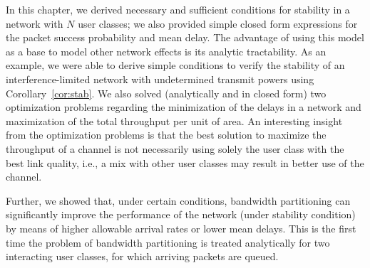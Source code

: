 In this chapter, we derived necessary and sufficient conditions for stability in a network with $N$ user classes; we also provided simple closed form expressions for the packet success probability and mean delay. The advantage of using this model as a base to model other network effects is its analytic tractability.
%
As an example, we were able to derive simple conditions to verify the stability of an interference-limited network with undetermined transmit powers using Corollary~\ref{cor:stab}.
%
We also solved (analytically and in closed form) two optimization problems regarding the minimization of the delays in a network and maximization of the total throughput per unit of area.
%
An interesting insight from the optimization problems is that the best solution to maximize the throughput of a channel is not necessarily using solely the user class with the best link quality, i.e., a mix with other user classes may result in better use of the channel.
% 

Further, we showed that, under certain conditions, bandwidth partitioning can significantly improve the performance of the network (under stability condition) by means of higher allowable arrival rates or lower mean delays. This is the first time the problem of bandwidth partitioning is treated analytically for two interacting user classes, for which arriving packets are queued.
